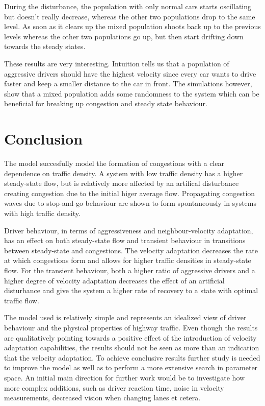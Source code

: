 \documentclass[11pt,a4paper,twocolumn]{article}
\begin{document}
During the disturbance, the population with only normal cars starts oscillating but doesn't really decrease, whereas the other two populations drop to the same level. As soon as it clears up the mixed population shoots back up to the previous levels whereas the other two populations go up, but then start drifting down towards the steady states.

These results are very interesting. Intuition tells us that a population of aggressive drivers should have the highest velocity since every car wants to drive faster and keep a smaller distance to the car in front. The simulations however, show that a mixed population adds some randomness to the system which can be beneficial for breaking up congestion and steady state behaviour.

\section{Conclusion}
The model succesfully model the formation of congestions with a clear dependence on traffic density. A system with low traffic density has a higher steady-state flow, but is relatively more affected by an artifical disturbance creating congestion due to the initial higer average flow. Propagating congestion waves due to stop-and-go behaviour are shown to form spontaneously in systems with high traffic density. 

Driver behaviour, in terms of aggressiveness and neighbour-velocity adaptation, has an effect on both steady-state flow and transient behaviour in transitions between steady-state and congestions. The velocity adaptation decreases the rate at which congestions form and allows for higher traffic densities in steady-state flow. For the transient behaviour, both a higher ratio of aggressive drivers and a higher degree of velocity adaptation decreases the effect of an artificial disturbance and give the system a higher rate of recovery to a state with optimal traffic flow.

The model used is relatively simple and represents an idealized view of driver behaviour and the physical properties of highway traffic. Even though the results are qualitatively pointing towards a positive effect of the introduction of velocity adaptation capabilities, the results should not be seen as more than an indication that the velocity adaptation. To achieve conclusive results further study is needed to improve the model as well as to perform a more extensive search in parameter space. An initial main direction for further work would be to investigate how more complex additions, such as driver reaction time, noise in velocity measurements, decreased vision when changing lanes et cetera.
\end{document}
